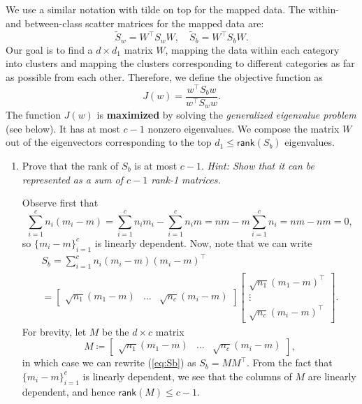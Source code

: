 \documentclass{../kin_math}
\begin{document}
\begin{questions}
  We use a similar notation with tilde on top for the mapped data. The within- and between-class scatter matrices for the mapped data are:
  \begin{equation}
    \tilde{S}_w = W^\top S_w W, \quad \tilde{S}_b = W^\top S_b W.
  \end{equation}
  Our goal is to find a $d \times d_1$ matrix $W$, mapping the data within each category into clusters and mapping the clusters corresponding to different categories as far as possible from each other. Therefore, we define the objective function as
  \begin{equation}
    J(w) = \frac{w^\top S_b w}{w^\top S_w w}.
  \end{equation}
  The function $J(w)$ is \textbf{maximized} by solving the \emph{generalized eigenvalue problem} (see below). It has at most $c - 1$ nonzero eigenvalues. We compose the matrix $W$ out of the eigenvectors corresponding to the top $d_1 \leq \textsf{rank}(S_b)$ eigenvalues.
  \begin{enumerate}[label=\arabic*.]
    \item Prove that the rank of $S_b$ is at most $c - 1$. \emph{Hint: Show that it can be represented as a sum of
    $c - 1$ rank-1 matrices.}
    \begin{solution}
      Observe first that
      \begin{equation*}
        \sum_{i = 1}^c n_i (m_i - m) = \sum_{i = 1}^c n_im_i - \sum_{i = 1}^c n_i m = nm - m \sum_{i = 1}^c n_i = nm - nm = 0,
      \end{equation*}
      so $\{m_i - m\}_{i = 1}^c$ is linearly dependent. Now, note that we can write
      \begin{multline}
        \label{eq:Sb}
        S_b = \sum_{i = 1}^c n_i (m_i - m) (m_i - m)^\top \\
        = \begin{bmatrix} \sqrt{n_1} (m_1 - m) & \dots & \sqrt{n_c} (m_i - m) \end{bmatrix} \begin{bmatrix} \sqrt{n_1} (m_1 - m)^\top \\ \vdots \\ \sqrt{n_c} (m_i - m)^\top \end{bmatrix}.
      \end{multline}
      For brevity, let $M$ be the $d \times c$ matrix
      \begin{equation*}
        M \coloneqq \begin{bmatrix} \sqrt{n_1} (m_1 - m) & \dots & \sqrt{n_c} (m_i - m) \end{bmatrix},
      \end{equation*}
      in which case we can rewrite (\ref{eq:Sb}) as $S_b = MM^\top$. From the fact that $\{m_i - m\}_{i = 1}^c$ is linearly dependent, we see that the columns of $M$ are linearly dependent, and hence $\textsf{rank}(M) \leq c - 1$.


\end{solution}
\end{enumerate}
\end{questions}
\end{document}
